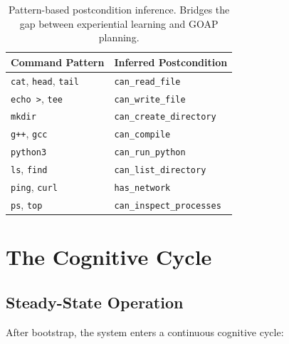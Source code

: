 \documentclass[12pt,a4paper]{report}
\begin{document}
\begin{table}[H]
\centering
\begin{tabular}{ll}
\toprule
\textbf{Command Pattern} & \textbf{Inferred Postcondition} \\
\midrule
\texttt{cat}, \texttt{head}, \texttt{tail} & \texttt{can\_read\_file} \\
\texttt{echo >}, \texttt{tee} & \texttt{can\_write\_file} \\
\texttt{mkdir} & \texttt{can\_create\_directory} \\
\texttt{g++}, \texttt{gcc} & \texttt{can\_compile} \\
\texttt{python3} & \texttt{can\_run\_python} \\
\texttt{ls}, \texttt{find} & \texttt{can\_list\_directory} \\
\texttt{ping}, \texttt{curl} & \texttt{has\_network} \\
\texttt{ps}, \texttt{top} & \texttt{can\_inspect\_processes} \\
\bottomrule
\end{tabular}
\caption{Pattern-based postcondition inference. Bridges the gap between experiential learning and GOAP planning.}
\end{table}

\chapter{The Cognitive Cycle}

\section{Steady-State Operation}
After bootstrap, the system enters a continuous cognitive cycle:
\end{document}
